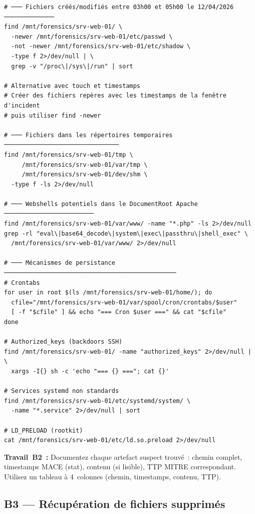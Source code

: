 \begin{lstlisting}[style=StyleTerminal,
  caption={Recherche de fichiers malveillants et persistances},
  label={lst:lab2-suspects}]
# ─── Fichiers créés/modifiés entre 03h00 et 05h00 le 12/04/2026 ──────────────
find /mnt/forensics/srv-web-01/ \
  -newer /mnt/forensics/srv-web-01/etc/passwd \
  -not -newer /mnt/forensics/srv-web-01/etc/shadow \
  -type f 2>/dev/null | \
  grep -v "/proc\|/sys\|/run" | sort

# Alternative avec touch et timestamps
# Créer des fichiers repères avec les timestamps de la fenêtre d'incident
# puis utiliser find -newer

# ─── Fichiers dans les répertoires temporaires ────────────────────────────────
find /mnt/forensics/srv-web-01/tmp \
     /mnt/forensics/srv-web-01/var/tmp \
     /mnt/forensics/srv-web-01/dev/shm \
  -type f -ls 2>/dev/null

# ─── Webshells potentiels dans le DocumentRoot Apache ─────────────────────────
find /mnt/forensics/srv-web-01/var/www/ -name "*.php" -ls 2>/dev/null
grep -rl "eval\|base64_decode\|system\|exec\|passthru\|shell_exec" \
  /mnt/forensics/srv-web-01/var/www/ 2>/dev/null

# ─── Mécanismes de persistance ────────────────────────────────────────────────
# Crontabs
for user in root $(ls /mnt/forensics/srv-web-01/home/); do
  cfile="/mnt/forensics/srv-web-01/var/spool/cron/crontabs/$user"
  [ -f "$cfile" ] && echo "=== Cron $user ===" && cat "$cfile"
done

# Authorized_keys (backdoors SSH)
find /mnt/forensics/srv-web-01/ -name "authorized_keys" 2>/dev/null | \
  xargs -I{} sh -c 'echo "=== {} ==="; cat {}'

# Services systemd non standards
find /mnt/forensics/srv-web-01/etc/systemd/system/ \
  -name "*.service" 2>/dev/null | sort

# LD_PRELOAD (rootkit)
cat /mnt/forensics/srv-web-01/etc/ld.so.preload 2>/dev/null
\end{lstlisting}

\begin{boxexo}
\textbf{Travail~B2~:} Documentez chaque artefact suspect trouvé~:
chemin complet, timestamps MACE (stat), contenu (si lisible),
TTP MITRE correspondant. Utilisez un tableau à 4~colonnes
(chemin, timestamps, contenu, TTP).
\end{boxexo}

\subsection{B3 — Récupération de fichiers supprimés}

